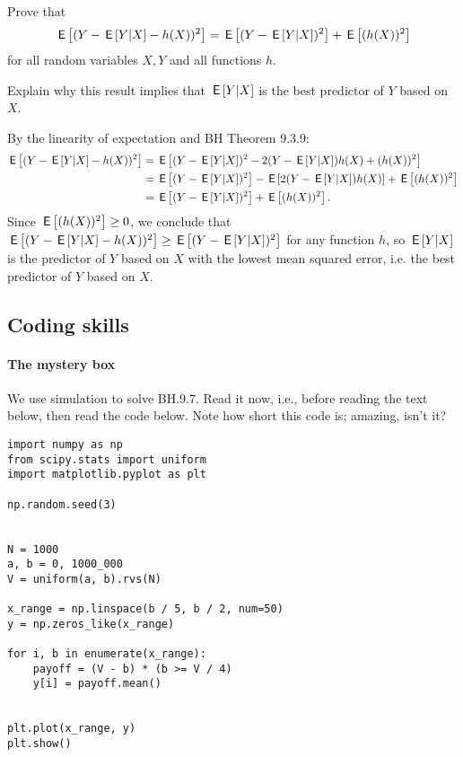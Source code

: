 \documentclass[assignments]{subfiles}
\begin{document}
\begin{exercise}
Prove that
\begin{equation}
  \label{eq:21}
\,\mathsf{E}\left[(Y - \,\mathsf{E}\left[Y|X\right] - h(X))^2\right] = \,\mathsf{E}\left[(Y - \,\mathsf{E}\left[Y|X\right])^2\right] + \,\mathsf{E}\left[(h(X))^2\right]
\end{equation}
for all random variables $X, Y$ and all functions $h$.

Explain why this result implies that  $\,\mathsf{E}\left[Y|X\right]$ is the best predictor of $Y$ based on $X$.
\begin{solution}
By the linearity of expectation and BH Theorem 9.3.9:
\begin{align*}
\,\mathsf{E}\left[(Y - \,\mathsf{E}\left[Y|X\right] - h(X))^2\right] &= \,\mathsf{E}\left[(Y - \,\mathsf{E}\left[Y|X\right])^2 - 2(Y - \,\mathsf{E}\left[Y|X\right])h(X) + (h(X))^2\right]
\\ &= \,\mathsf{E}\left[(Y - \,\mathsf{E}\left[Y|X\right])^2\right] - \,\mathsf{E}\left[2(Y - \,\mathsf{E}\left[Y|X\right])h(X)\right] + \,\mathsf{E}\left[(h(X))^2\right]
\\ &= \,\mathsf{E}\left[(Y - \,\mathsf{E}\left[Y|X\right])^2\right] + \,\mathsf{E}\left[(h(X))^2\right].
\end{align*}
Since $\,\mathsf{E}\left[(h(X))^2\right] \geq 0$, we conclude that $\,\mathsf{E}\left[(Y - \,\mathsf{E}\left[Y|X\right] - h(X))^2\right] \geq \,\mathsf{E}\left[(Y - \,\mathsf{E}\left[Y|X\right])^2\right]$ for any function $h$, so $\,\mathsf{E}\left[Y|X\right]$ is the predictor of $Y$ based on $X$ with the lowest mean squared error, i.e. the best predictor of $Y$ based on $X$.
\end{solution}
\end{exercise}


\subsection{Coding skills}
\label{sec:coding-skills-1}

\paragraph{The mystery box}

We use  simulation to solve  BH.9.7.
Read it now, i.e., before reading the text below, then read the code below.
Note how short  this code is;  amazing, isn't it?



\begin{verbatim}
import numpy as np
from scipy.stats import uniform
import matplotlib.pyplot as plt

np.random.seed(3)


N = 1000
a, b = 0, 1000_000
V = uniform(a, b).rvs(N)

x_range = np.linspace(b / 5, b / 2, num=50)
y = np.zeros_like(x_range)

for i, b in enumerate(x_range):
    payoff = (V - b) * (b >= V / 4)
    y[i] = payoff.mean()


plt.plot(x_range, y)
plt.show()
\end{verbatim}
\end{document}
